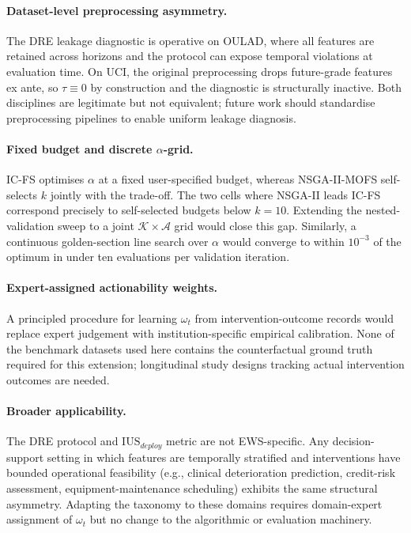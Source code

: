\documentclass[a4paper,fleqn]{cas-sc}
\begin{document}
\paragraph{Dataset-level preprocessing asymmetry.}
The DRE leakage diagnostic is operative on OULAD, where all features are retained across horizons and the protocol can expose temporal violations at evaluation time.
On UCI, the original preprocessing drops future-grade features ex ante, so $\tau \equiv 0$ by construction and the diagnostic is structurally inactive.
Both disciplines are legitimate but not equivalent; future work should standardise preprocessing pipelines to enable uniform leakage diagnosis.

\paragraph{Fixed budget and discrete $\alpha$-grid.}
IC-FS optimises $\alpha$ at a fixed user-specified budget, whereas NSGA-II-MOFS self-selects $k$ jointly with the trade-off. The two cells where NSGA-II leads IC-FS correspond precisely to self-selected budgets below $k=10$. Extending the nested-validation sweep to a joint $\mathcal{K} \times \mathcal{A}$ grid would close this gap.
Similarly, a continuous golden-section line search over $\alpha$ would converge to within $10^{-3}$ of the optimum in under ten evaluations per validation iteration.

\paragraph{Expert-assigned actionability weights.}
A principled procedure for learning $\omega_t$ from intervention-outcome records would replace expert judgement with institution-specific empirical calibration. None of the benchmark datasets used here contains the counterfactual ground truth required for this extension; longitudinal study designs tracking actual intervention outcomes are needed.

\paragraph{Broader applicability.}
The DRE protocol and $\mathrm{IUS}_{deploy}$ metric are not EWS-specific.
Any decision-support setting in which features are temporally stratified and interventions have bounded operational feasibility (e.g., clinical deterioration prediction, credit-risk assessment, equipment-maintenance scheduling) exhibits the same structural asymmetry. Adapting the taxonomy to these domains requires domain-expert assignment of $\omega_t$ but no change to the algorithmic or evaluation machinery.
\end{document}

